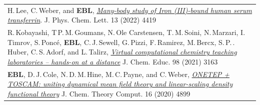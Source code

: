 \documentclass[10pt,a4paper,final]{article}
\begin{document}
\begin{tabularx}{\textwidth}{
   X}
   H.\,Lee, C.\,Weber, and \textbf{EBL}, \href{https://doi.org/10.1021/acs.jpclett.2c00680}{\textit{Many-body study of Iron (III)-bound human serum transferrin}}. J. Phys. Chem. Lett. 13 (2022) 4419                                                                                                                                                                                                                                                                                                                                                                                                                                                                                                                                                                      \\ %
   R.\,Kobayashi, T\,P.\,M.\,Goumans, N.\,Ole Carstensen, T.\,M.\,Soini, N.\,Marzari, I.\,Timrov, S.\,Ponc\'e, \textbf{EBL}, C.\,J.\,Sewell, G.\,Pizzi, F.\,Ramirez, M.\,Bercx, S.\,P.\,. Huber, C.\,S.\,Adorf, and L.\,Talirz, \href{https://doi.org/10.1021/acs.jchemed.1c00655}{\textit{Virtual computational chemistry teaching laboratories – hands-on at a distance}} J. Chem. Educ. 98 (2021) 3163                                                                                                                                                                                                                                                                                                                                                                  \\ %
   \textbf{EBL}, D.\,J.\,Cole, N.\,D.\,M.\,Hine, M.\,C.\,Payne, and C.\,Weber, \href{https://doi.org/10.1021/acs.jctc.0c00162}{\textit{ONETEP + TOSCAM: uniting dynamical mean field theory and linear-scaling density functional theory}} J. Chem. Theory Comput. 16 (2020) 4899                                                                                                                                                                                                                                                                                                                                                                                                                                                                                          \\ %

\end{tabularx}
\end{document}
